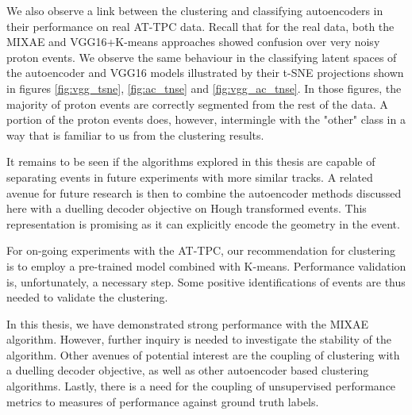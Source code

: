 We also observe a link between the clustering and classifying autoencoders in their performance on real AT-TPC data. Recall that for the real data, both the MIXAE and VGG16+K-means approaches showed confusion over very noisy proton events. We observe the same behaviour in the classifying latent spaces of the autoencoder and VGG16 models illustrated by their t-SNE projections shown in figures \ref{fig:vgg_tsne}, \ref{fig:ac_tnse} and \ref{fig:vgg_ac_tnse}.  In those figures, the majority of proton events are correctly segmented from the rest of the data. A portion of the proton events does, however, intermingle with the "other" class in a way that is familiar to us from the clustering results.

It remains to be seen if the algorithms explored in this thesis are capable of separating events in future experiments with more similar tracks. A related avenue for future research is then to combine the autoencoder methods discussed here with a duelling decoder objective on Hough transformed events. This representation is promising as it can explicitly encode the geometry in the event.

For on-going experiments with the AT-TPC, our recommendation for clustering is to employ a pre-trained model combined with K-means. Performance validation is, unfortunately, a necessary step. Some positive identifications of events are thus needed to validate the clustering. 

In this thesis, we have demonstrated strong performance with the MIXAE algorithm. However, further inquiry is needed to investigate the stability of the algorithm. Other avenues of potential interest are the coupling of clustering with a duelling decoder objective, as well as other autoencoder based clustering algorithms. Lastly, there is a need for the coupling of unsupervised performance metrics to measures of performance against ground truth labels.  